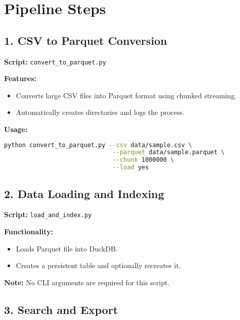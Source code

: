 \documentclass[a4paper,11pt]{article}
\begin{document}
\section{Pipeline Steps}

\subsection{1. CSV to Parquet Conversion}

\textbf{Script:} \texttt{convert\_to\_parquet.py}

\begin{tcolorbox}[colback=green!5, colframe=green!40!black]
\textbf{Features:}
\begin{itemize}[leftmargin=1em]
  \item Converts large CSV files into Parquet format using chunked streaming.
  \item Automatically creates directories and logs the process.
\end{itemize}
\end{tcolorbox}

\textbf{Usage:}
\begin{lstlisting}[language=bash, caption=CSV to Parquet Conversion]
python convert_to_parquet.py --csv data/sample.csv \
                              --parquet data/sample.parquet \
                              --chunk 1000000 \
                              --load yes
\end{lstlisting}

\subsection{2. Data Loading and Indexing}

\textbf{Script:} \texttt{load\_and\_index.py}

\begin{tcolorbox}[colback=orange!5, colframe=orange!40!black]
\textbf{Functionality:}
\begin{itemize}[leftmargin=1em]
  \item Loads Parquet file into DuckDB.
  \item Creates a persistent table and optionally recreates it.
\end{itemize}
\end{tcolorbox}

\textbf{Note:} No CLI arguments are required for this script.

\subsection{3. Search and Export}
\end{document}
